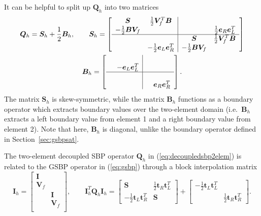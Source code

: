 \documentclass[review,onefignum,onetabnum,final]{siamart171218}
\newcommand{\LRs}[1]{\left[ #1 \right]}
\begin{document}
It can be helpful to split up $\bm{Q}_h$ into two matrices
\begin{gather*}
\bm{Q}_h = \bm{S}_h + \frac{1}{2}\bm{B}_h, \qquad
\bm{S}_h= \LRs{\begin{array}{cc|cc}
\bm{S} &  \frac{1}{2}\bm{V}_f^T\bm{B} & & \\
 - \frac{1}{2}\bm{B}\bm{V}_f &  & & \frac{1}{2}\bm{e}_R\bm{e}_L^T\\
 \hline
&& \bm{S} &  \frac{1}{2}\bm{V}_f^T\bm{B} \\
& -\frac{1}{2}\bm{e}_L\bm{e}_R^T &  - \frac{1}{2}\bm{B}\bm{V}_f &\\
\end{array}}\\
\bm{B}_h = \LRs{\begin{array}{cc|cc}
&  & & \\
 & -\bm{e}_L\bm{e}_L^T & & \\
 \hline
&&  &  \\
&  && \bm{e}_R\bm{e}_R^T\\
\end{array}}.
\end{gather*}
The matrix $\bm{S}_h$ is skew-symmetric, while the matrix $\bm{B}_h$ functions as a boundary operator which extracts boundary values over the two-element domain (i.e.\ $\bm{B}_h$ extracts a left boundary value from element 1 and a right boundary value from element 2).  Note that here, $\bm{B}_h$ is diagonal, unlike the boundary operator defined in Section~\ref{sec:gsbpsat}.  

The two-element decoupled SBP operator $\bm{Q}_h$ in (\ref{eq:decoupledsbp2elem}) is related to the GSBP operator in (\ref{eq:gsbp}) through a block interpolation matrix
\[
\bm{I}_h = \begin{bmatrix}
\bm{I} &\\
\bm{V}_f &\\
&\bm{I}\\
&\bm{V}_f\\
\end{bmatrix}, \qquad \bm{I}_h^T\bm{Q}_h\bm{I}_h = {\begin{bmatrix}
\bm{S}  & \frac{1}{2}\bm{t}_R\bm{t}_L^T \\
- \frac{1}{2}\bm{t}_L\bm{t}_R^T & \bm{S}
\end{bmatrix}}
+
{\begin{bmatrix}
-\frac{1}{2}\bm{t}_L\bm{t}_L^T  & \\
 & \frac{1}{2} \bm{t}_R\bm{t}_R^T
\end{bmatrix}}.
\]
\end{document}
